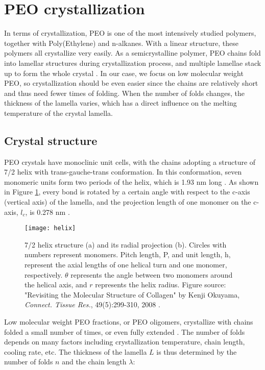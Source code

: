 \section{PEO crystallization}

In terms of crystallization, PEO is one of the most intensively studied polymers, together with Poly(Ethylene) and n-alkanes. With a linear structure, these polymers all crystallize very easily. As a semicrystalline polymer, PEO chains fold into lamellar structures during crystallization process, and multiple lamellae stack up to form the whole crystal \cite{Arlif1966}. In our case, we focus on low molecular weight PEO, so crystallization should be even easier since the chains are relatively short and thus need fewer times of folding. When the number of folds changes, the thickness of the lamella varies, which has a direct influence on the melting temperature of the crystal lamella.

\subsection{Crystal structure}

PEO crystals have monoclinic unit cells, with the chains adopting a structure of 7/2 helix with trans-gauche-trans conformation. In this conformation, seven monomeric units form two periods of the helix, which is 1.93 nm long \cite{Yoshihara1964}. As shown in Figure \ref{fig:PEOhelix}, every bond is rotated by a certain angle with respect to the c-axis (vertical axis) of the lamella, and the projection length of one monomer on the c-axis, $l_{c}$, is 0.278 nm \cite{Takahashi1973}.

\begin{figure}[H]
\center
\vspace{1 cm}
\texttt{[image: helix]}
\caption[7/2 helix structure (a) and its radial projection (b).]{7/2 helix structure (a) and its radial projection (b). Circles with numbers represent monomers. Pitch length, P, and unit length, h, represent the axial lengths of one helical turn and one monomer, respectively. $\theta$ represents the angle between two monomers around the helical axis, and $r$ represents the helix radius. Figure source: "Revisiting the Molecular Structure of Collagen" by Kenji Okuyama, \textit{Connect. Tissue Res.}, 49(5):299-310, 2008 \cite{Okuyama2008}.}
\label{fig:PEOhelix}
\end{figure}

Low molecular weight PEO fractions, or PEO oligomers, crystallize with chains folded a small number of times, or even fully extended \cite{Kovacs1975,Kovacs1977}. The number of folds depends on many factors including crystallization temperature, chain length, cooling rate, etc. The thickness of the lamella $L$ is thus determined by the number of folds $n$ and the chain length $\lambda$:

